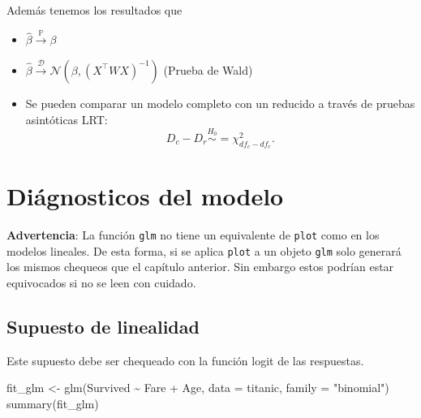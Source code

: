 \documentclass[
  12pt,
]{book}
\newenvironment{Shaded}{\begin{snugshade}}{\end{snugshade}}
\newcommand{\AttributeTok}[1]{\textcolor[rgb]{0.77,0.63,0.00}{#1}}
\newcommand{\FunctionTok}[1]{\textcolor[rgb]{0.00,0.00,0.00}{#1}}
\newcommand{\NormalTok}[1]{#1}
\newcommand{\OtherTok}[1]{\textcolor[rgb]{0.56,0.35,0.01}{#1}}
\newcommand{\SpecialCharTok}[1]{\textcolor[rgb]{0.00,0.00,0.00}{#1}}
\newcommand{\StringTok}[1]{\textcolor[rgb]{0.31,0.60,0.02}{#1}}
\providecommand{\tightlist}{%
  \setlength{\itemsep}{0pt}\setlength{\parskip}{0pt}}
\begin{document}
Además tenemos los resultados que

\begin{itemize}
\tightlist
\item
  \(\hat{\beta} \xrightarrow{\mathbb{P}} \beta\)
\item
  \(\hat{\beta} \xrightarrow{\mathcal{D}} \mathcal{N}\left(\beta,(X^{\top}WX)^{-1}\right)\)
  (Prueba de Wald)
\item
  Se pueden comparar un modelo completo con un reducido a través de
  pruebas asintóticas LRT: \begin{equation*}
  D_c -D_r \stackrel{H_0}{\sim} =\chi^{2}_{df_{c}-df_r}.
  \end{equation*}
\end{itemize}

\hypertarget{diuxe1gnosticos-del-modelo}{%
\section{Diágnosticos del modelo}\label{diuxe1gnosticos-del-modelo}}

\textbf{Advertencia}: La función \texttt{glm} no tiene un equivalente de
\texttt{plot} como en los modelos lineales. De esta forma, si se aplica
\texttt{plot} a un objeto \texttt{glm} solo generará los mismos chequeos
que el capítulo anterior. Sin embargo estos podrían estar equivocados si
no se leen con cuidado.

\hypertarget{supuesto-de-linealidad}{%
\subsection{Supuesto de linealidad}\label{supuesto-de-linealidad}}

Este supuesto debe ser chequeado con la función logit de las respuestas.

\begin{Shaded}
\begin{Highlighting}[]
\NormalTok{fit\_glm }\OtherTok{\textless{}{-}} \FunctionTok{glm}\NormalTok{(Survived }\SpecialCharTok{\textasciitilde{}}\NormalTok{ Fare }\SpecialCharTok{+}\NormalTok{ Age, }\AttributeTok{data =}\NormalTok{ titanic,}
    \AttributeTok{family =} \StringTok{"binomial"}\NormalTok{)}
\FunctionTok{summary}\NormalTok{(fit\_glm)}
\end{Highlighting}
\end{Shaded}
\end{document}

